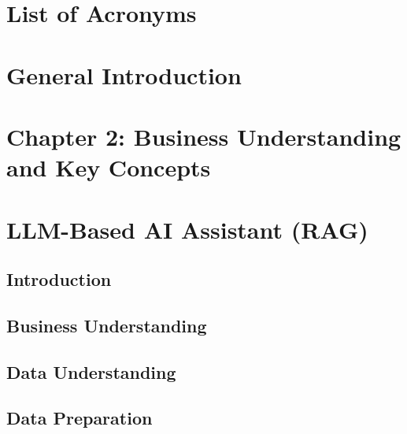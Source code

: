 \documentclass[12pt]{report}
\begin{document}
\chapter*{List of Acronyms}


\newpage

\chapter*{General Introduction}


\newpage

\setcounter{chapter}{2}  %
\setcounter{section}{0}
\chapter*{Chapter 2: Business Understanding and Key Concepts}



\newpage




\setcounter{chapter}{4} 
\chapter{LLM-Based AI Assistant (RAG)} %
\label{chap:llm-rag}

\section*{Introduction}

\pagebreak  %



\section{Business Understanding} %

\section{Data Understanding} %

\section{Data Preparation} %

\end{document}
